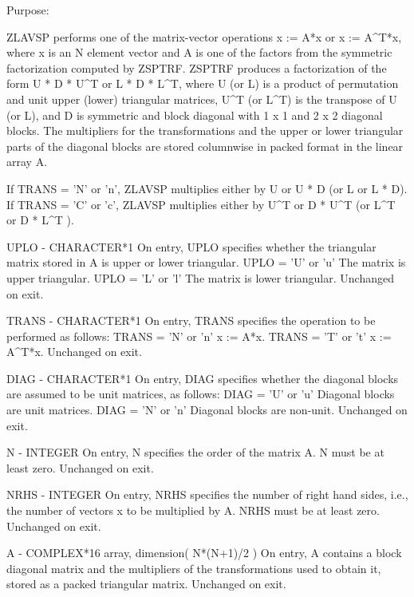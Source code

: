 \begin{DoxyParagraph}{Purpose\+: }
\begin{DoxyVerb}    ZLAVSP  performs one of the matrix-vector operations
       x := A*x  or  x := A^T*x,
    where x is an N element vector and  A is one of the factors
    from the symmetric factorization computed by ZSPTRF.
    ZSPTRF produces a factorization of the form
         U * D * U^T     or     L * D * L^T,
    where U (or L) is a product of permutation and unit upper (lower)
    triangular matrices, U^T (or L^T) is the transpose of
    U (or L), and D is symmetric and block diagonal with 1 x 1 and
    2 x 2 diagonal blocks.  The multipliers for the transformations
    and the upper or lower triangular parts of the diagonal blocks
    are stored columnwise in packed format in the linear array A.

    If TRANS = 'N' or 'n', ZLAVSP multiplies either by U or U * D
    (or L or L * D).
    If TRANS = 'C' or 'c', ZLAVSP multiplies either by U^T or D * U^T
    (or L^T or D * L^T ).\end{DoxyVerb}
 \begin{DoxyVerb}  UPLO   - CHARACTER*1
           On entry, UPLO specifies whether the triangular matrix
           stored in A is upper or lower triangular.
              UPLO = 'U' or 'u'   The matrix is upper triangular.
              UPLO = 'L' or 'l'   The matrix is lower triangular.
           Unchanged on exit.

  TRANS  - CHARACTER*1
           On entry, TRANS specifies the operation to be performed as
           follows:
              TRANS = 'N' or 'n'   x := A*x.
              TRANS = 'T' or 't'   x := A^T*x.
           Unchanged on exit.

  DIAG   - CHARACTER*1
           On entry, DIAG specifies whether the diagonal blocks are
           assumed to be unit matrices, as follows:
              DIAG = 'U' or 'u'   Diagonal blocks are unit matrices.
              DIAG = 'N' or 'n'   Diagonal blocks are non-unit.
           Unchanged on exit.

  N      - INTEGER
           On entry, N specifies the order of the matrix A.
           N must be at least zero.
           Unchanged on exit.

  NRHS   - INTEGER
           On entry, NRHS specifies the number of right hand sides,
           i.e., the number of vectors x to be multiplied by A.
           NRHS must be at least zero.
           Unchanged on exit.

  A      - COMPLEX*16 array, dimension( N*(N+1)/2 )
           On entry, A contains a block diagonal matrix and the
           multipliers of the transformations used to obtain it,
           stored as a packed triangular matrix.
           Unchanged on exit.


\end{DoxyVerb}
\end{DoxyParagraph}
